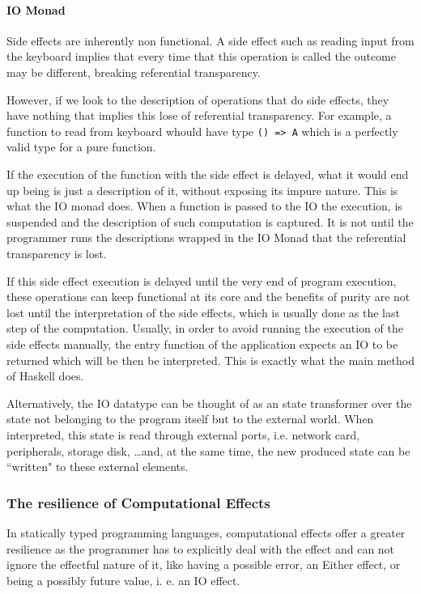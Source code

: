 \documentclass[../main.tex]{subfiles}
\begin{document}


\paragraph{IO Monad}
Side effects are inherently non functional. A side effect such as reading input
from the keyboard implies that every time that this operation is called the
outcome may be different, breaking referential transparency.

However, if we look to the description of operations that do side effects, they
have nothing that implies this lose of referential transparency. For example,
a function to read from keyboard whould have type \texttt{() => A} which is a
perfectly valid type for a pure function.

If the execution of the function with the side effect is delayed, what it
would end up being is just a description of it, without exposing its impure
nature. This is what the IO monad does. When a function is passed to the IO
the execution, is suspended and the description of such computation is captured. It is not
until the programmer runs the descriptions wrapped in the IO Monad that the
referential transparency is lost.

If this side effect execution is delayed until the very end of program execution, these operations
can keep functional at its core and the benefits of purity are not lost until
the interpretation of the side effects, which is usually done as the last step of
the computation. Usually, in order to avoid running the execution of the side
effects manually, the entry function of the application expects an IO to be
returned which will be then be interpreted. This is exactly what the main method
of Haskell does\autocite{Hudak2000AIO}.

Alternatively, the IO datatype can be thought of as an state transformer over 
the state not belonging to the program itself but to the external world. When
interpreted, this state is read through external ports, i.e.
network card, peripherals, storage disk, \ldots and, at the same time, the new produced 
state can be ``written" to these external elements.

\subsubsection{The resilience of Computational Effects}
In statically typed programming languages, computational effects offer a greater resilience as the
programmer has to explicitly deal with the effect and can not ignore the
effectful nature of it, like having a possible error, an Either effect, or being a possibly
future value, i. e. an IO effect.
\end{document}
